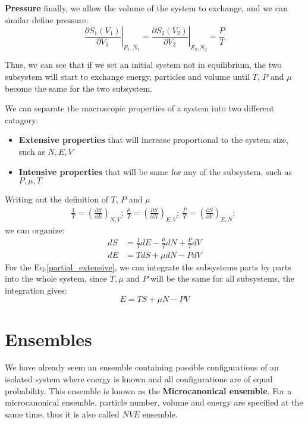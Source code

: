 \documentclass{article}
\begin{document}
\textbf{Pressure}
finally, we allow the volume of the system to exchange, and we can similar define pressure:
\begin{equation}
    \left. \frac{\partial S_1(V_1)}{\partial V_1} \right|_{E_1,N_1} = \left. \frac{\partial S_2(V_2)}{\partial V_2}\right|_{E_2,N_2} = \frac{P}{T}
\end{equation}

Thus, we can see that if we set an initial system not in equilibrium, the two subsystem will
start to exchange energy, particles and volume until $T$, $P$ and $\mu$ become the same 
for the two subsystem. 

We can separate the macroscopic properties of a system into two different catagory:
\begin{itemize}
    \item \textbf{Extensive properties} that will increase proportional to the system size, such as $N,E,V$
    \item \textbf{Intensive properties} that will be same for any of the subsystem, such as  $P,\mu,T$
\end{itemize}

Writing out the definition of  $T$, $P$ and $\mu$
\begin{gather}
    \frac{1}{T} = \left(\frac{\partial S}{\partial E}\right)_{N,V};\  
    \frac{\mu}{T} = \left(\frac{\partial S}{\partial N}\right)_{E,V};\ 
    \frac{P}{T} = \left(\frac{\partial S}{\partial V}\right)_{E,N};\ 
\end{gather}
we can organize:
\begin{align}
    dS &= \frac{1}{T} dE - \frac{\mu}{T}dN + \frac{P}{T}dV \\
    dE &= TdS + \mu dN - P dV \label{partial_extensive}
\end{align}
For the Eq.\ref{partial_extensive}, we can integrate the subsystems parts by parts into 
the whole system, since $T, \mu$ and $P$ will be the same for all subsystems, the integration
gives:
\begin{equation}
    E = TS + \mu N - PV
\end{equation}

\section{Ensembles}
We have already seem an ensemble containing possible configurations of an isolated system where energy
is known and all configurations are of equal probability. 
This ensemble is known as the \textbf{Microcanonical ensemble}. For a microcanonical ensemble, particle 
number, volume and energy are specified at the same time, thus it is also called $NVE$ ensemble.
\end{document}

